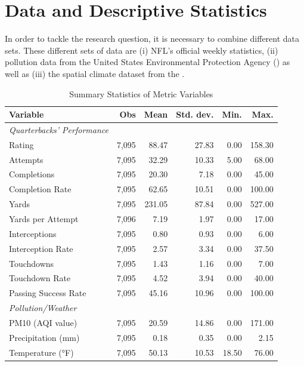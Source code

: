 \documentclass[12pt,a4paper]{article}
\begin{document}
\clearpage

\section{Data and Descriptive Statistics}
In order to tackle the research question, it is necessary to combine different data sets. These different sets of data are (i) NFL's official weekly statistics, (ii) pollution data from the United States Environmental Protection Agency (\citeauthor{EPA}) as well as (iii) the spatial climate dataset from the \citeauthor{PRISM}. 



\begin{table}[h]
  \centering
  \caption{Summary Statistics of Metric Variables}
  \label{tab:1}
  \begin{tabular}{lrrrrr}
    \hline \hline
    Variable & Obs & Mean & Std. dev. & Min. & Max. \\
    \hline
    \textit{Quarterbacks' Performance} \\
    Rating & 7,095 & 88.47 & 27.83 & 0.00 & 158.30 \\
    Attempts & 7,095 & 32.29 & 10.33 & 5.00 & 68.00 \\
    Completions & 7,095 & 20.30 & 7.18 & 0.00 & 45.00 \\
    Completion Rate & 7,095 & 62.65 & 10.51 & 0.00 & 100.00 \\
    Yards & 7,095 & 231.05 & 87.84 & 0.00 & 527.00 \\
    Yards per Attempt & 7,096 & 7.19 & 1.97 & 0.00 & 17.00 \\
    Interceptions & 7,095 & 0.80 & 0.93 & 0.00 & 6.00 \\
    Interception Rate & 7,095 & 2.57 & 3.34 & 0.00 & 37.50 \\
    Touchdowns & 7,095 & 1.43 & 1.16 & 0.00 & 7.00 \\
    Touchdown Rate & 7,095 & 4.52 & 3.94 & 0.00 & 40.00 \\
    Passing Success Rate & 7,095 & 45.16 & 10.96 & 0.00 & 100.00 \\ [0.5cm]
    \textit{Pollution/Weather} \\
    PM10 (AQI value) & 7,095 & 20.59 & 14.86 & 0.00 & 171.00 \\
    Precipitation (mm) & 7,095 & 0.18 & 0.35 & 0.00 & 2.15 \\
    Temperature (°F) & 7,095 & 50.13 & 10.53 & 18.50 & 76.00 \\
    \hline \hline
  \end{tabular}
\end{table}
\end{document}
